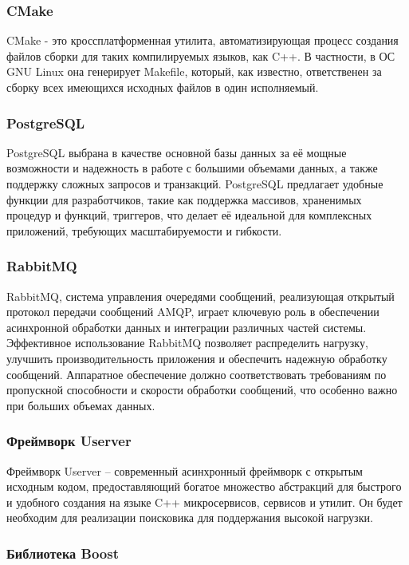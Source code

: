 \subsubsection{CMake}

CMake - это кроссплатформенная утилита, автоматизирующая процесс создания файлов сборки для таких компилируемых языков, как C++. В частности, в ОС GNU Linux она генерирует Makefile, который, как известно, ответственен за сборку всех имеющихся исходных файлов в один исполняемый. 

\subsubsection{PostgreSQL}

PostgreSQL выбрана в качестве основной базы данных за её мощные возможности и надежность в работе с большими объемами данных, а также поддержку сложных запросов и транзакций. PostgreSQL предлагает удобные функции для разработчиков, такие как поддержка массивов, храненимых процедур и функций, триггеров, что делает её идеальной для комплексных приложений, требующих масштабируемости и гибкости.

\subsubsection{RabbitMQ} 
RabbitMQ, система управления очередями сообщений, реализующая открытый протокол передачи сообщений AMQP, играет ключевую роль в обеспечении асинхронной обработки данных и интеграции различных частей системы. Эффективное использование RabbitMQ позволяет распределить нагрузку, улучшить производительность приложения и обеспечить надежную обработку сообщений. Аппаратное обеспечение должно соответствовать требованиям по пропускной способности и скорости обработки сообщений, что особенно важно при больших объемах данных.

\subsubsection{Фреймворк Userver}
Фреймворк Userver -- современный асинхронный фреймворк с открытым исходным кодом, предоставляющий богатое множество абстракций для быстрого и удобного создания на языке C++ микросервисов, сервисов и утилит. Он будет необходим для реализации поисковика для поддержания высокой нагрузки.

\subsubsection{Библиотека Boost}

